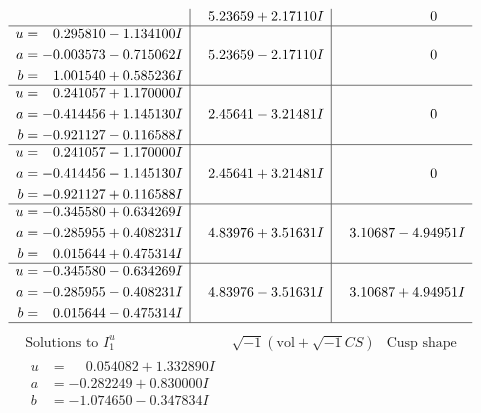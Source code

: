 \documentclass[1p]{elsarticle_modified}
\theoremstyle{definition}
\newcommand{\I}{\sqrt{-1}}
\begin{document}
$$\begin{array}{c|c|c}
 & \phantom{-}5.23659 + 2.17110 I & \phantom{-0.000000 } 0 \\ \hline\begin{aligned}
u &= \phantom{-}0.295810 - 1.134100 I \\
a &= -0.003573 - 0.715062 I \\
b &= \phantom{-}1.001540 + 0.585236 I\end{aligned}
 & \phantom{-}5.23659 - 2.17110 I & \phantom{-0.000000 } 0 \\ \hline\begin{aligned}
u &= \phantom{-}0.241057 + 1.170000 I \\
a &= -0.414456 + 1.145130 I \\
b &= -0.921127 - 0.116588 I\end{aligned}
 & \phantom{-}2.45641 - 3.21481 I & \phantom{-0.000000 } 0 \\ \hline\begin{aligned}
u &= \phantom{-}0.241057 - 1.170000 I \\
a &= -0.414456 - 1.145130 I \\
b &= -0.921127 + 0.116588 I\end{aligned}
 & \phantom{-}2.45641 + 3.21481 I & \phantom{-0.000000 } 0 \\ \hline\begin{aligned}
u &= -0.345580 + 0.634269 I \\
a &= -0.285955 + 0.408231 I \\
b &= \phantom{-}0.015644 + 0.475314 I\end{aligned}
 & \phantom{-}4.83976 + 3.51631 I & \phantom{-}3.10687 - 4.94951 I \\ \hline\begin{aligned}
u &= -0.345580 - 0.634269 I \\
a &= -0.285955 - 0.408231 I \\
b &= \phantom{-}0.015644 - 0.475314 I\end{aligned}
 & \phantom{-}4.83976 - 3.51631 I & \phantom{-}3.10687 + 4.94951 I\\
 \hline 
 \end{array}$$\newpage$$\begin{array}{c|c|c}  
\text{Solutions to }I^u_{1}& \I (\text{vol} + \sqrt{-1}CS) & \text{Cusp shape}\\
 \hline 
\begin{aligned}
u &= \phantom{-}0.054082 + 1.332890 I \\
a &= -0.282249 + 0.830000 I \\
b &= -1.074650 - 0.347834 I\end{aligned}

\end{array}$$
\end{document}
